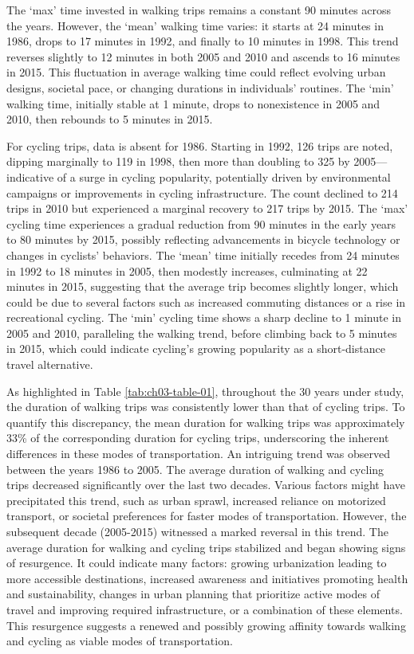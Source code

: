 \documentclass[
11pt, %
oneside, %
english, %
singlespacing, %
]{macthesis} %
\begin{document}
The `max' time invested in walking trips remains a constant 90 minutes across the years. However, the `mean' walking time varies: it starts at 24 minutes in 1986, drops to 17 minutes in 1992, and finally to 10 minutes in 1998. This trend reverses slightly to 12 minutes in both 2005 and 2010 and ascends to 16 minutes in 2015. This fluctuation in average walking time could reflect evolving urban designs, societal pace, or changing durations in individuals' routines. The `min' walking time, initially stable at 1 minute, drops to nonexistence in 2005 and 2010, then rebounds to 5 minutes in 2015.

For cycling trips, data is absent for 1986. Starting in 1992, 126 trips are noted, dipping marginally to 119 in 1998, then more than doubling to 325 by 2005---indicative of a surge in cycling popularity, potentially driven by environmental campaigns or improvements in cycling infrastructure. The count declined to 214 trips in 2010 but experienced a marginal recovery to 217 trips by 2015. The `max' cycling time experiences a gradual reduction from 90 minutes in the early years to 80 minutes by 2015, possibly reflecting advancements in bicycle technology or changes in cyclists' behaviors. The `mean' time initially recedes from 24 minutes in 1992 to 18 minutes in 2005, then modestly increases, culminating at 22 minutes in 2015, suggesting that the average trip becomes slightly longer, which could be due to several factors such as increased commuting distances or a rise in recreational cycling. The `min' cycling time shows a sharp decline to 1 minute in 2005 and 2010, paralleling the walking trend, before climbing back to 5 minutes in 2015, which could indicate cycling's growing popularity as a short-distance travel alternative.

As highlighted in Table \ref{tab:ch03-table-01}, throughout the 30 years under study, the duration of walking trips was consistently lower than that of cycling trips. To quantify this discrepancy, the mean duration for walking trips was approximately 33\% of the corresponding duration for cycling trips, underscoring the inherent differences in these modes of transportation. An intriguing trend was observed between the years 1986 to 2005. The average duration of walking and cycling trips decreased significantly over the last two decades. Various factors might have precipitated this trend, such as urban sprawl, increased reliance on motorized transport, or societal preferences for faster modes of transportation. However, the subsequent decade (2005-2015) witnessed a marked reversal in this trend. The average duration for walking and cycling trips stabilized and began showing signs of resurgence. It could indicate many factors: growing urbanization leading to more accessible destinations, increased awareness and initiatives promoting health and sustainability, changes in urban planning that prioritize active modes of travel and improving required infrastructure, or a combination of these elements. This resurgence suggests a renewed and possibly growing affinity towards walking and cycling as viable modes of transportation.
\end{document}
